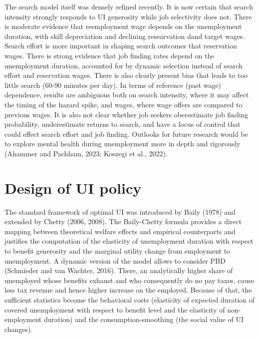 \documentclass{article}
\begin{document}
The search model itself was densely refined recently. It is now certain that search intensity strongly responds to UI generosity while job selectivity does not. There is moderate evidence that reemployment wage depends on the unemployment duration, with skill depreciation and declining researvation dand target wages. Search effort is more important in shaping search outcomes that reservation wages. There is strong evidence that job finding rates depend on the unemployment duration, accounted for by dynamic selection instead of search effort and reservation wages. There is also clearly present bias that leads to too little search (60-90 minutes per day). In terms of reference (past wage) dependence, results are ambiguous both on search intensity, where it may affect the timing of the hazard spike, and wages, where wage offers are compared to previous wages. It is also not clear whether job seekers oberestimate job finding probability, underestimate returns to search, and have a locus of control that could effect search effort and job finding. Outlooks for future research would be to explore mental health during unemployment more in depth and rigorously (Ahammer and Pachham, 2023; Koszegi et al., 2022).

\section{Design of UI policy}

The standard framework of optimal UI was introduced by Baily (1978) and extended by Chetty (2006, 2008). The Baily-Chetty formula provides a direct mapping between theoretical welfare effects and empirical counterparts and justifies the computation of the elasticity of unemployment duration with respect to benefit generosity and the marginal utility change from employment to unemployment. A dynamic version of the model allows to consider PBD (Schmieder and van Wachter, 2016). There, an analytically higher share of unemployed whose benefits exhaust and who consequently do no pay taxes, cause less tax revenue and hence higher increase on the employed. Because of that, the sufficient statistics become the behavioral costs (elasticity of expected duration of covered unemployment with respect to benefit level and the elasticity of non-employment duration) and the consumption-smoothing (the social value of UI changes).
\end{document}

